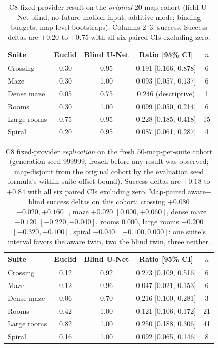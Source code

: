 \documentclass[letterpaper]{article} %
\newcommand{\stage}[1]{\textsc{#1}}
\begin{document}
\begin{table}[t]
\centering
\small
\setlength{\tabcolsep}{3pt}
\begin{tabular}{@{}lcccc@{}}
\toprule
Suite & Euclid & Blind U-Net & Ratio [95\% CI] & $n$ \\
\midrule
Crossing & 0.30 & 0.95 & 0.191 [0.166, 0.878] & 6 \\
Maze & 0.30 & 1.00 & 0.093 [0.057, 0.137] & 6 \\
Dense maze & 0.05 & 0.75 & 0.246 (descriptive) & 1 \\
Rooms & 0.30 & 1.00 & 0.099 [0.050, 0.214] & 6 \\
Large rooms & 0.75 & 0.95 & 0.228 [0.185, 0.418] & 15 \\
Spiral & 0.20 & 0.95 & 0.087 [0.061, 0.287] & 4 \\
\bottomrule
\end{tabular}
\caption{\stage{C8} fixed-provider result on the \emph{original} 20-map cohort (field U-Net blind; no future-motion input; additive mode; binding budgets; map-level bootstraps). Columns 2--3: success. Success deltas are $+0.20$ to $+0.75$ with all six paired CIs excluding zero.}
\label{tab:c8fixed}
\end{table}

\begin{table}[t]
\centering
\small
\setlength{\tabcolsep}{3pt}
\begin{tabular}{@{}lcccc@{}}
\toprule
Suite & Euclid & Blind U-Net & Ratio [95\% CI] & $n$ \\
\midrule
Crossing & 0.12 & 0.92 & 0.273 [0.109, 0.516] & 6 \\
Maze & 0.12 & 0.96 & 0.047 [0.021, 0.153] & 6 \\
Dense maze & 0.06 & 0.70 & 0.216 [0.100, 0.281] & 3 \\
Rooms & 0.42 & 1.00 & 0.121 [0.106, 0.172] & 21 \\
Large rooms & 0.82 & 1.00 & 0.250 [0.188, 0.306] & 41 \\
Spiral & 0.16 & 1.00 & 0.092 [0.065, 0.146] & 8 \\
\bottomrule
\end{tabular}
\caption{\stage{C8} fixed-provider \emph{replication} on the fresh 50-map-per-suite cohort (generation seed 999999, frozen before any result was observed; map-disjoint from the original cohort by the evaluation seed formula's within-suite offset bound). Success deltas are $+0.18$ to $+0.84$ with all six paired CIs excluding zero. Map-paired aware$-$blind success deltas on this cohort: crossing $+0.080$ $[+0.020,+0.160]$, maze $+0.020$ $[0.000,+0.060]$, dense maze $-0.120$ $[-0.220,-0.040]$, rooms $0.000$, large rooms $-0.200$ $[-0.320,-0.100]$, spiral $-0.040$ $[-0.100,0.000]$: one suite's interval favors the aware twin, two the blind twin, three neither.}
\label{tab:c8fresh}
\end{table}
\end{document}
